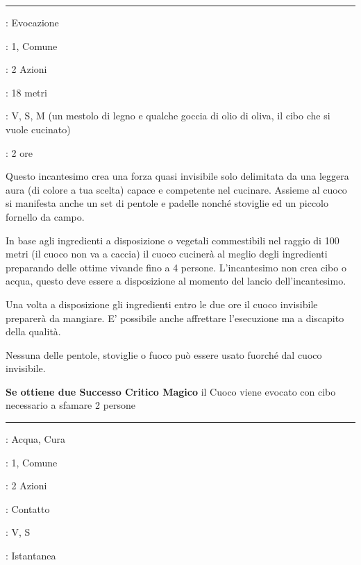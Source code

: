 \begin{multicols}{2}
\smallskip\noindent\rule{\linewidth}{2pt} \hypertarget{Cuoco Invisibile}{}\smallskip{}
\noindent
\begin{description}[noitemsep, topsep=0pt, parsep=0pt, partopsep=0pt, leftmargin=0cm, labelwidth=2.8cm]
	\item[\textbf{Lista di Magia}]: Evocazione
	\item[\textbf{Livello}]: 1, Comune
	\item[\textbf{T. di Lancio}]: 2 Azioni
	\item[\textbf{Gittata}]: 18 metri
	\item[\textbf{Componenti}]: V, S, M (un mestolo di legno e qualche goccia di olio di oliva, il cibo che si vuole cucinato)
	\item[\textbf{Durata}]: 2 ore
\end{description}

Questo incantesimo crea una forza quasi invisibile solo delimitata da una leggera aura (di colore a tua scelta) capace e competente nel cucinare. Assieme al cuoco si manifesta anche un set di pentole e padelle nonché stoviglie ed un piccolo fornello da campo.

In base agli ingredienti a disposizione o vegetali commestibili nel raggio di 100 metri (il cuoco non va a caccia) il cuoco cucinerà al meglio degli ingredienti preparando delle ottime vivande fino a 4 persone. L'incantesimo non crea cibo o acqua, questo deve essere a disposizione al momento del lancio dell'incantesimo.

Una volta a disposizione gli ingredienti entro le due ore il cuoco invisibile preparerà da mangiare. E' possibile anche affrettare l'esecuzione ma a discapito della qualità.

Nessuna delle pentole, stoviglie o fuoco può essere usato fuorché dal cuoco invisibile.

\textbf{Se ottiene due Successo Critico Magico} il Cuoco viene evocato con cibo necessario a sfamare 2 persone

\smallskip\noindent\rule{\linewidth}{2pt} \hypertarget{Cura Ferite}{}\smallskip{}
\noindent
\begin{description}[noitemsep, topsep=0pt, parsep=0pt, partopsep=0pt, leftmargin=0cm, labelwidth=2.8cm]
	\item[\textbf{Lista di Magia}]: Acqua, Cura
	\item[\textbf{Livello}]: 1, Comune
	\item[\textbf{T. di Lancio}]: 2 Azioni
	\item[\textbf{Gittata}]: Contatto
	\item[\textbf{Componenti}]: V, S
	\item[\textbf{Durata}]: Istantanea
\end{description}


\end{multicols}
